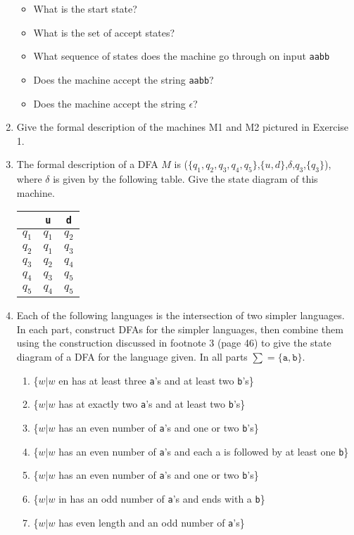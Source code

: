 \documentclass{article}
\begin{document}
\begin{enumerate}
        \begin{itemize}
\item What is the start state?
\item What is the set of accept states?
\item What sequence of states does the machine go through on input \texttt{aabb}
\item Does the machine accept the string \texttt{aabb}?
\item Does the machine accept the string $\epsilon$?
        \end{itemize}

\item Give the formal description of the machines M1 and M2 pictured in Exercise
1.


\item The formal description of a DFA $M$ is
($\{q_1,q_2,q_3,q_4,q_5\}$,$\{u,d\}$,$\delta$,$q_3$,$\{q_3\}$), where $\delta$
is given by the following table. Give the state diagram of this machine.

\begin{center}
\begin{tabular}{c|cc}
            &   \texttt{u}     &   \texttt{d} \\
    \hline
    $q_1$   &   $q_1$   &   $q_2$   \\
    $q_2$   &   $q_1$   &   $q_3$   \\
    $q_3$   &   $q_2$   &   $q_4$   \\
    $q_4$   &   $q_3$   &   $q_5$   \\
    $q_5$   &   $q_4$   &   $q_5$
\end{tabular}
\end{center}


\item Each of the following languages is the intersection of two simpler
languages. In each part, construct DFAs for the simpler languages, then combine
them using the construction discussed in footnote 3 (page 46) to give the state
diagram of a DFA for the language given. In all parts $\sum = \{\texttt{a}, \texttt{b}\}$.

    \begin{enumerate}
        \item \{$w|w$ en has at least three \texttt{a}'s and at least two \texttt{b}'s\}
        \item \{$w|w$ has at exactly two \texttt{a}'s and at least two \texttt{b}'s\}
        \item \{$w|w$ has an even number of \texttt{a}'s and one or two \texttt{b}'s\}
        \item \{$w|w$ has an even number of \texttt{a}'s and each a is followed by at least one \texttt{b}\}
        \item \{$w|w$ has an even number of \texttt{a}'s and one or two \texttt{b}'s\}
        \item \{$w|w$ in has an odd number of \texttt{a}'s and ends with a \texttt{b}\}
        \item \{$w|w$ has even length and an odd number of \texttt{a}'s\}
    \end{enumerate}


\end{enumerate}
\end{document}
